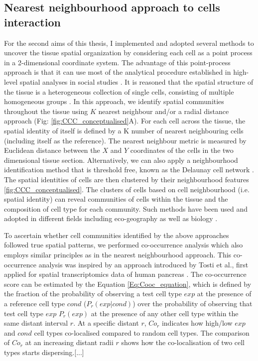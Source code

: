 \subsection{Nearest neighbourhood approach to cells interaction}
For the second aims of this thesis, I implemented and adopted several methods to uncover the tissue spatial organization by considering each cell as a point process in a 2-dimensional coordinate system. The advantage of this point-process approach is that it can use most of the analytical procedure established in high-level spatial analyses in social studies \cite{yushimito2012voronoi}. It is reasoned that the spatial structure of the tissue is a heterogeneous collection of single cells, consisting of multiple homogeneous groups \cite{schurch2020coordinated}. In this approach, we identify spatial communities throughout the tissue using $K$ nearest neighbour and/or a radial distance approach (Fig: \ref{fig:CCC_conceptualised}A). For each cell across the tissue, the spatial identity of itself is defined by a K number of nearest neighbouring cells (including itself as the reference). The nearest neighbour metric is measured by Euclidean distance between the $X$ and $Y$ coordinates of the cells in the two dimensional tissue section. Alternatively, we can also apply a neighbourhood identification method that is threshold free, known as the Delaunay cell network \cite{guibas1985primitives, dries2021giotto}. The spatial identities of cells are then clustered by their neighbourhood features \ref{fig:CCC_conceptualised}. The clusters of cells based on cell neighbourhood (i.e. spatial identity) can reveal communities of cells within the tissue and the composition of cell type for each community. Such methods have been used and adopted in different fields including eco-geography as well as biology \cite{goltsev2018CODEX, dries2021giotto}.

To ascertain whether cell communities identified by the above approaches followed true spatial patterns, we performed co-occurrence analysis which also employs similar principles as in the nearest neighbourhood approach. This co-occurrence analysis was inspired by an approach introduced by Tosti et al., first applied for spatial transcriptomics data of human pancreas \cite{tosti2021single}. The co-occurrence score can be estimated by the Equation \ref{Eq:Cooc_equation}, which is defined by the fraction of the probability of observing a test cell type $exp$ at the presence of a reference cell type $cond$ ($P_{r}(exp|cond)$) over the probability of observing that test cell type $exp$ $P_{r}(exp)$ at the presence of any other cell type within the same distant interval $r$. At a specific distant $r$, $Co_{r}$ indicates how high/low $exp$ and $cond$ cell types co-localised compared to random cell types. The comparison of $Co_{r}$ at an increasing distant radii $r$ shows how the co-localisation of two cell types starts dispersing.[...]


